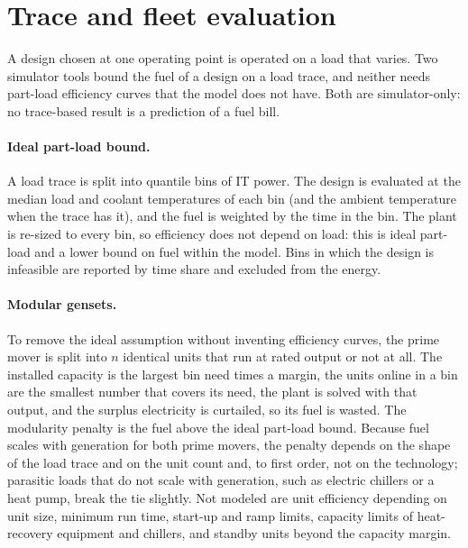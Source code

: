 \section{Trace and fleet evaluation}\label{sec:trace}

A design chosen at one operating point is operated on a load that varies. Two simulator tools bound the fuel of a design on a load trace, and
neither needs part-load efficiency curves that the model does not have. Both are simulator-only: no trace-based result is a prediction of a fuel bill.

\paragraph{Ideal part-load bound.}
A load trace is split into quantile bins of IT power. The design is evaluated at the median load and coolant temperatures of each bin (and the ambient
temperature when the trace has it), and the fuel is weighted by the time in the bin. The plant is re-sized to every bin, so efficiency does not depend on load: this is ideal
part-load and a lower bound on fuel within the model. Bins in which the design is infeasible are reported by time share and excluded from the energy.

\paragraph{Modular gensets.}
To remove the ideal assumption without inventing efficiency curves, the prime mover is split into $n$ identical units that run at rated output or not at all. The installed capacity is
the largest bin need times a margin, the units online in a bin are the smallest number that covers its need, the plant is solved with that output, and the surplus electricity is curtailed,
so its fuel is wasted. The modularity penalty is the fuel above the ideal part-load bound. Because fuel scales with generation for both prime movers, the penalty depends on the shape of the
load trace and on the unit count and, to first order, not on the technology; parasitic loads that do not scale with generation, such as electric chillers or a heat pump, break the tie slightly.
Not modeled are unit efficiency depending on unit size, minimum run time, start-up and ramp limits, capacity limits of heat-recovery equipment and chillers, and standby units beyond the capacity margin.

